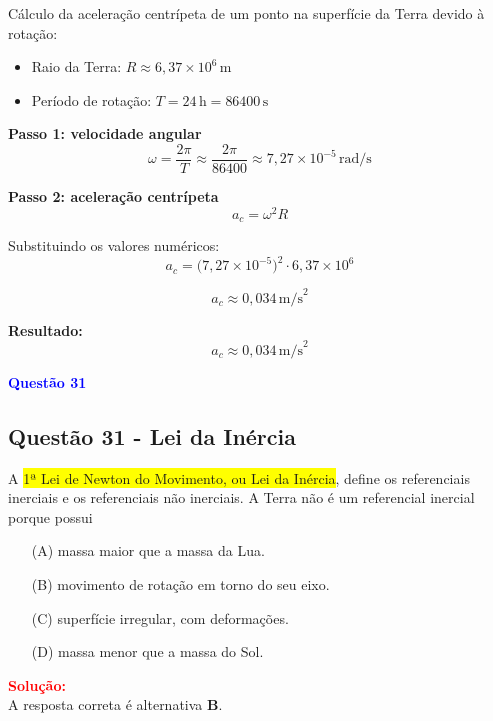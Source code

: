 \documentclass[a4paper,12pt]{article}
\begin{document}
Cálculo da aceleração centrípeta de um ponto na superfície da Terra devido à rotação:

\begin{itemize}
  \item Raio da Terra: \( R \approx 6,37 \times 10^6 \, \mathrm{m} \)
  \item Período de rotação: \( T = 24 \, \mathrm{h} = 86400 \, \mathrm{s} \)
\end{itemize}

\textbf{Passo 1: velocidade angular}
\[
\omega = \frac{2\pi}{T} \approx \frac{2\pi}{86400} \approx 7,27 \times 10^{-5} \, \mathrm{rad/s}
\]

\textbf{Passo 2: aceleração centrípeta}
\[
a_c = \omega^2 R
\]

Substituindo os valores numéricos:
\[
a_c = \bigl(7,27 \times 10^{-5}\bigr)^2 \cdot 6,37 \times 10^6
\]

\[
a_c \approx 0,034 \, \mathrm{m/s}^2
\]

\textbf{Resultado:}
\[
\boxed{a_c \approx 0,034 \, \mathrm{m/s}^2}
\]

\begin{flushleft}
\textbf{\textcolor{blue}{\Large Quest\~ao 31}}\\
\noindent
\subsection{Quest\~ao 31 - Lei da In\'ercia}
A \colorbox{yellow}{1ª Lei de Newton do Movimento, ou Lei da Inércia}, define 
os referenciais inerciais e os referenciais não inerciais. \colorbox{green!40}{A 
Terra não é um referencial inercial porque possui}

\begin{itemize}
\item[(A)] massa maior que a massa da Lua.
\item[(B)] movimento de rotação em torno do seu eixo.
\item[(C)] superfície irregular, com deformações.
\item[(D)] massa menor que a massa do Sol.
\end{itemize}

\vspace{0.5cm}

\textcolor{red}{\textbf{Solução:}}\\

A resposta correta é alternativa \colorbox{green!50}{\textbf{B}}.
\end{flushleft}
\end{document}
